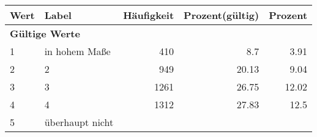      \begin{longtable}{lXrrr}
     \toprule
     \textbf{Wert} & \textbf{Label} & \textbf{Häufigkeit} & \textbf{Prozent(gültig)} & \textbf{Prozent} \\
     \endhead
     \midrule
     \multicolumn{5}{l}{\textbf{Gültige Werte}}\\

     1 &
     \multicolumn{1}{X}{ in hohem Maße   } &


       \num{410} &
       \num[round-mode=places,round-precision=2]{8.7} &
         \num[round-mode=places,round-precision=2]{3.91} \\

     2 &
     \multicolumn{1}{X}{ 2   } &


       \num{949} &
       \num[round-mode=places,round-precision=2]{20.13} &
         \num[round-mode=places,round-precision=2]{9.04} \\

     3 &
     \multicolumn{1}{X}{ 3   } &


       \num{1261} &
       \num[round-mode=places,round-precision=2]{26.75} &
         \num[round-mode=places,round-precision=2]{12.02} \\

     4 &
     \multicolumn{1}{X}{ 4   } &


       \num{1312} &
       \num[round-mode=places,round-precision=2]{27.83} &
         \num[round-mode=places,round-precision=2]{12.5} \\

     5 &
     \multicolumn{1}{X}{ überhaupt nicht   } &



\end{longtable}
